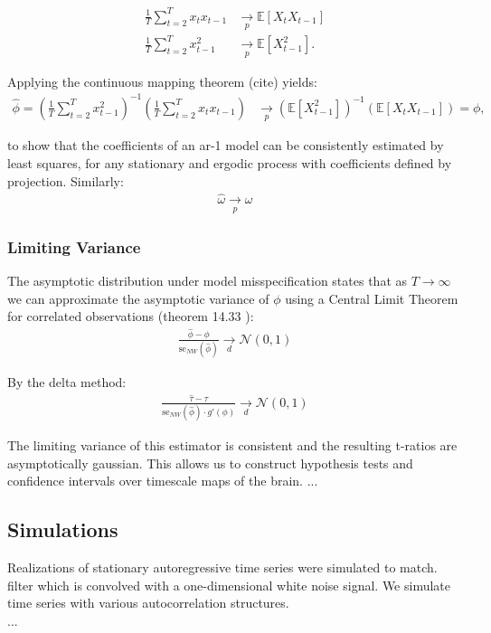 \documentclass[main.tex]{subfiles}
\begin{document}
\begin{align*}
    \frac{1}{T} \sum_{t=2}^T x_t x_{t-1} &\underset{p}{\to} \mathbb{E}[X_t X_{t-1}]\\
    \frac{1}{T} \sum_{t=2}^T x_{t-1}^2 &\underset{p}{\to} \mathbb{E}[X_{t-1}^2].
\end{align*}

Applying the continuous mapping theorem (cite) yields:
\begin{align*}
    \hat\phi = (\frac{1}{T} \sum_{t=2}^T x_{t-1}^2)^{-1} ( \frac{1}{T} \sum_{t=2}^T x_t x_{t-1}) &\underset{p}{\to} (\mathbb{E}[X_{t-1}^2])^{-1}(\mathbb{E}[X_t X_{t-1}]) = \phi,
\end{align*}

to show that the coefficients of an ar-1 model can be consistently estimated by least squares, for any stationary and ergodic process with coefficients defined by projection. Similarly:
\begin{align*}
    \hat \omega \underset{p}{\to} \omega
\end{align*}


\subsubsection*{Limiting Variance}
The asymptotic distribution under model misspecification  states that as $T\to\infty$ we can approximate the asymptotic variance of $\phi$ using a Central Limit Theorem for correlated observations (theorem 14.33 \cite{hansen_econometrics_2020}):
\begin{align*}
\frac{\hat\phi - \phi}{\text{se}_{NW}(\hat\phi)} \underset{d}{\to} \mathcal{N}(0, 1)
\end{align*}

By the delta method:
\begin{align*}
    \frac{\hat{\tau} - \tau}{\text{se}_{NW}(\hat{\phi}) \cdot g'(\phi)} \underset{d}{\to} \mathcal{N}(0,1)
\end{align*}

The limiting variance of this estimator is consistent and the resulting t-ratios are asymptotically gaussian. This allows us to construct hypothesis tests and confidence intervals over timescale maps of the brain.
...

\subsection{Simulations}  
Realizations of stationary autoregressive time series were simulated to match.
filter which is convolved with a one-dimensional white noise signal.
We simulate time series with various autocorrelation structures.\\
...
\end{document}
